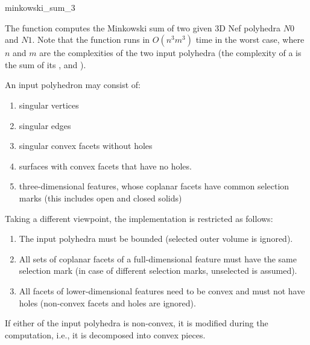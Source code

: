 
\ccHtmlNoClassLinks
\begin{ccRefFunction}{minkowski_sum_3}
\label{refminkowski_sum_3}

\ccDefinition

The function  computes the Minkowski sum of two
given 3D Nef polyhedra $N0$ and $N1$. Note that the function runs in
$O(n^3m^3)$ time in the worst case, where $n$ and
$m$ are the complexities of the two input polyhedra (the complexity of
a  is the sum of its ,
 and ).


\ccPrecond

An input polyhedron may consist of:
\begin{enumerate}
\item singular vertices
\item singular edges
\item singular convex facets without holes
\item surfaces with convex facets that have no holes.
\item three-dimensional features, whose coplanar facets have
common selection marks (this includes open and closed solids)
\end{enumerate}

Taking a different viewpoint, the implementation is restricted as
follows:
\begin{enumerate}
\item The input polyhedra must be bounded (selected outer volume is ignored).
\item All sets of coplanar facets of a full-dimensional
feature must have the same selection mark (in case of different
selection marks, unselected is assumed).
\item All facets of lower-dimensional features need to be convex and 
must not have holes (non-convex facets and holes are ignored).
\end{enumerate}

\ccPostcond

If either of the input polyhedra is non-convex, it is modified during
the computation, i.e., it is decomposed into convex pieces.

\ccSeeAlso
{}\\ 
\\ 

\end{ccRefFunction}
